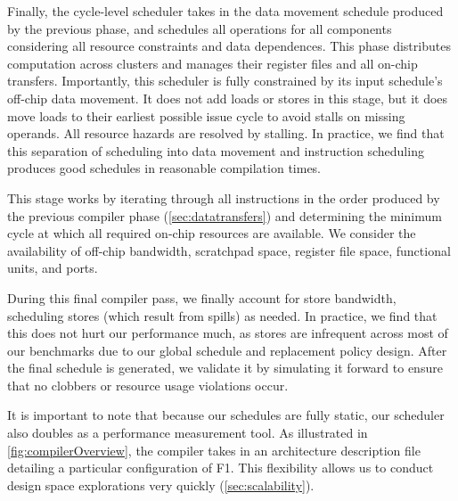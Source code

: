 Finally, the cycle-level scheduler takes in the data movement schedule produced by the previous phase,
and schedules all operations for all components considering all resource constraints and data dependences.
This phase distributes computation across clusters and manages their register files and all on-chip transfers.
Importantly, this scheduler is fully constrained by its input schedule's off-chip data movement. 
It does not add loads or stores in this stage, but it does move loads to
their earliest possible issue cycle to avoid stalls on missing operands.
All resource hazards are resolved by stalling.
In practice, we find that this separation of scheduling into data movement and instruction scheduling produces good schedules in reasonable compilation times.

This stage works by iterating through all instructions in the order produced by the previous compiler phase (\autoref{sec:datatransfers}) and determining the minimum cycle at which all required on-chip resources are available. We consider the availability of off-chip bandwidth, scratchpad space, register file space, functional units, and ports.


During this final compiler pass, we finally account for store bandwidth, scheduling stores (which result from spills) as needed. In practice, we find that this does not hurt our performance much, as stores are infrequent across most of our benchmarks due to our global schedule and replacement policy design. After the final schedule is generated, we validate it by simulating it forward to ensure that no clobbers or resource usage violations occur.

It is important to note that because our schedules are fully static, our scheduler also doubles as a performance measurement tool. As illustrated in \autoref{fig:compilerOverview}, the compiler takes in an architecture description file detailing a particular configuration of F1. This flexibility allows us to conduct design space explorations very quickly (\autoref{sec:scalability}).
